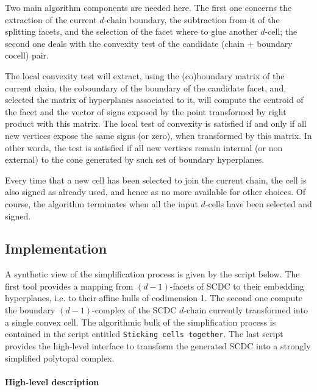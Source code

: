 \documentclass[11pt,oneside]{article}	%
\begin{document}
Two main algorithm components are needed here. The first one concerns the extraction of the current $d$-chain boundary, the subtraction from it of the splitting facets, and the selection of the facet where to glue another $d$-cell; the second one deals with the convexity test of the candidate (chain $+$ boundary cocell) pair.

The local convexity test will extract, using the (co)boundary matrix of the current chain, the coboundary of the boundary of the candidate facet, and, selected the matrix of hyperplanes associated to it, will compute the centroid of the facet and the vector of signs exposed by the point transformed by right product with this matrix. The local test of convexity is satisfied if and only if all new vertices expose the same signs (or zero), when transformed by this matrix. In other words, the test is satisfied  if all new vertices remain internal (or non external) to the cone generated by such set of boundary hyperplanes.

Every time that a new cell has been selected to join the current chain, the cell is also signed as already used, and hence as no more available for other choices. Of course, the algorithm terminates when all the input  $d$-cells have been selected and signed.


\subsection{Implementation}
A synthetic view of the simplification process is given by the script below.
The first tool provides a mapping from $(d-1)$-facets of SCDC to their embedding hyperplanes, i.e. to their affine hulls of codimension 1. The second one compute the boundary $(d-1)$-complex of the SCDC $d$-chain currently transformed into a single convex cell. The algorithmic bulk of the simplification process is contained in the script entitled \texttt{Sticking cells together}. The last script provides the high-level interface to transform the generated SCDC into a strongly simplified polytopal complex.

\paragraph{High-level description}
\end{document}
